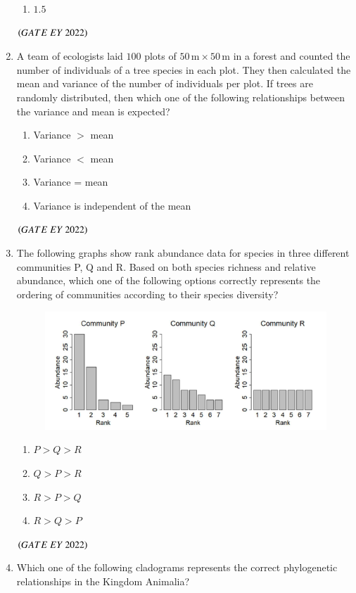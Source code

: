 \documentclass[journal]{IEEEtran}
\numberwithin{equation}{enumi}
\numberwithin{figure}{enumi}
\begin{document}
\begin{enumerate}
\begin{enumerate}
        \item  $1.5$
    \end{enumerate}
    \hfill{$\brak{ GATE\ EY\ 2022}$}
    \bigskip
 \item A team of ecologists laid $100$ plots of $50\,\text{m} \times 50\,\text{m}$ in a forest and counted the number
of individuals of a tree species in each plot. They then calculated the mean and
variance of the number of individuals per plot. If trees are randomly distributed, then
which one of the following relationships between the variance and mean is expected?
    \begin{enumerate}
        \item  Variance $>$ mean
        \item  Variance $<$ mean
        \item  Variance = mean
        \item  Variance is independent of the mean
    \end{enumerate}
    \hfill{$\brak{ GATE\ EY\ 2022}$}
    \bigskip
 \item The following graphs show rank abundance data for species in three different
communities P, Q and R. Based on both species richness and relative abundance,
which one of the following options correctly represents the ordering of communities
according to their species diversity?
\begin{figure}[H]
    \centering
\includegraphics[width=0.5\columnwidth]{figs/13.png}
    \caption{}
    \label{fig:13}
   \end{figure}
    \begin{enumerate}
        \item  $P > Q > R$
        \item  $Q > P > R$
        \item  $R > P > Q$
        \item  $R > Q > P$
    \end{enumerate}
    \hfill{$\brak{ GATE\ EY\ 2022}$}
    \bigskip
 \item Which one of the following cladograms represents the correct phylogenetic
relationships in the Kingdom Animalia?
\begin{figure}[H]
    \centering

\end{figure}
\end{enumerate}
\end{document}
